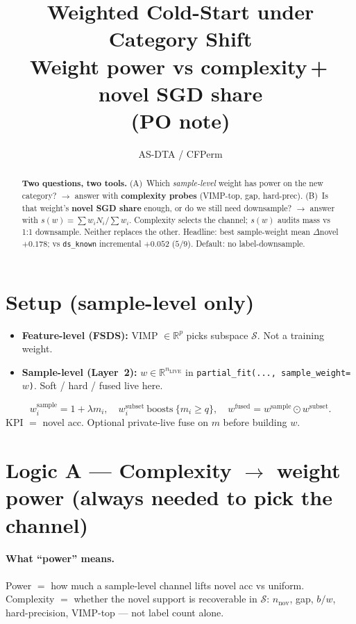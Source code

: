 \documentclass[11pt]{article}
\title{Weighted Cold-Start under Category Shift\\
\large Weight power vs complexity\,+\,novel SGD share\\
\large (PO note)}
\author{AS-DTA / CFPerm}
\date{}
\begin{document}
\maketitle

\begin{abstract}
\noindent
\textbf{Two questions, two tools.}
(A)~Which \emph{sample-level} weight has power on the new category?
$\to$ answer with \textbf{complexity probes} (VIMP-top, gap, hard-prec).
(B)~Is that weight's \textbf{novel SGD share} enough, or do we still need
downsample?
$\to$ answer with $s(w)=\sum w_i N_i/\sum w_i$.
Complexity selects the channel; $s(w)$ audits mass vs 1:1 downsample.
Neither replaces the other.
Headline: best sample-weight mean $\Delta$novel $+0.178$;
vs \texttt{ds\_known} incremental $\mathbf{+0.052}$ ($5/9$).
Default: no label-downsample.
\end{abstract}

\section{Setup (sample-level only)}

\begin{itemize}
  \item \textbf{Feature-level (FSDS):} VIMP $\in\mathbb{R}^p$ picks subspace
        $\mathcal{S}$. Not a training weight.
  \item \textbf{Sample-level (Layer~2):} $w\in\mathbb{R}^{n_{\mathrm{LIVE}}}$
        in \texttt{partial\_fit(..., sample\_weight=$w$)}.
        Soft / hard / fused live here.
\end{itemize}
\[
w^{\mathrm{sample}}_i=1+\lambda m_i,\quad
w^{\mathrm{subset}}_i\ \mathrm{boosts}\ \{m_i\ge q\},\quad
w^{\mathrm{fused}}=w^{\mathrm{sample}}\odot w^{\mathrm{subset}}.
\]
KPI $=$ novel acc. Optional private-live fuse on $m$ before building $w$.

\section{Logic A --- Complexity $\to$ weight power
(always needed to pick the channel)}

\paragraph{What ``power'' means.}
Power $=$ how much a sample-level channel lifts novel acc vs uniform.
Complexity $=$ whether the novel support is recoverable in $\mathcal{S}$:
$n_{\mathrm{nov}}$, gap, $b/w$, hard-precision, VIMP-top --- not label count alone.
\end{document}
